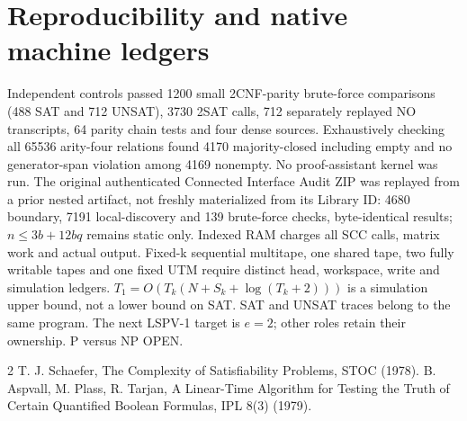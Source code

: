 \documentclass[11pt]{article}
\begin{document}
\section{Reproducibility and native machine ledgers}
Independent controls passed 1200 small 2CNF-parity brute-force
comparisons (488 SAT and 712 UNSAT), 3730 2SAT calls,
712 separately replayed NO transcripts, 64 parity chain
tests and four dense sources. Exhaustively checking all 65536
arity-four relations found 4170 majority-closed including empty
and no generator-span violation among 4169 nonempty.
No proof-assistant kernel was run. The original authenticated
Connected Interface Audit ZIP was replayed from a prior
nested artifact, not freshly materialized from its Library ID:
4680 boundary, 7191 local-discovery and 139 brute-force checks,
byte-identical results; $n\le3b+12bq$ remains static only.
Indexed RAM charges all SCC calls, matrix work and actual output.
Fixed-k sequential multitape, one shared tape, two fully writable
tapes and one fixed UTM require distinct head, workspace, write
and simulation ledgers. $T_1=O(T_k(N+S_k+\log(T_k+2)))$
is a simulation upper bound, not a lower bound on SAT.
SAT and UNSAT traces belong to the same program.
The next LSPV-1 target is $e=2$; other roles retain their ownership.
P versus NP OPEN.
\begin{thebibliography}{2}
 T. J. Schaefer, The Complexity of Satisfiability Problems, STOC (1978).
 B. Aspvall, M. Plass, R. Tarjan, A Linear-Time Algorithm for Testing the Truth of Certain Quantified Boolean Formulas, IPL 8(3) (1979).
\end{thebibliography}
\end{document}
